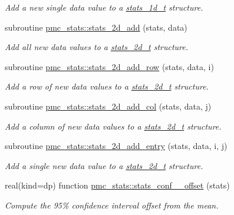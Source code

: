 \begin{DoxyCompactItemize}
\begin{DoxyCompactList}\small\item\em Add a new single data value to a {\ttfamily \mbox{\hyperlink{structpmc__stats_1_1stats__1d__t}{stats\+\_\+1d\+\_\+t}}} structure. \end{DoxyCompactList}\item 
subroutine \mbox{\hyperlink{namespacepmc__stats_adf44b0b2ca237de63a455f077ad5c51e}{pmc\+\_\+stats\+::stats\+\_\+2d\+\_\+add}} (stats, data)
\begin{DoxyCompactList}\small\item\em Add all new data values to a {\ttfamily \mbox{\hyperlink{structpmc__stats_1_1stats__2d__t}{stats\+\_\+2d\+\_\+t}}} structure. \end{DoxyCompactList}\item 
subroutine \mbox{\hyperlink{namespacepmc__stats_a130511c11730c58ad4e4a75eece0330b}{pmc\+\_\+stats\+::stats\+\_\+2d\+\_\+add\+\_\+row}} (stats, data, i)
\begin{DoxyCompactList}\small\item\em Add a row of new data values to a {\ttfamily \mbox{\hyperlink{structpmc__stats_1_1stats__2d__t}{stats\+\_\+2d\+\_\+t}}} structure. \end{DoxyCompactList}\item 
subroutine \mbox{\hyperlink{namespacepmc__stats_a3d4adead65ab33601c8d28a1edb89755}{pmc\+\_\+stats\+::stats\+\_\+2d\+\_\+add\+\_\+col}} (stats, data, j)
\begin{DoxyCompactList}\small\item\em Add a column of new data values to a {\ttfamily \mbox{\hyperlink{structpmc__stats_1_1stats__2d__t}{stats\+\_\+2d\+\_\+t}}} structure. \end{DoxyCompactList}\item 
subroutine \mbox{\hyperlink{namespacepmc__stats_ab357ab9aa317d0059079eb870bfc17eb}{pmc\+\_\+stats\+::stats\+\_\+2d\+\_\+add\+\_\+entry}} (stats, data, i, j)
\begin{DoxyCompactList}\small\item\em Add a single new data value to a {\ttfamily \mbox{\hyperlink{structpmc__stats_1_1stats__2d__t}{stats\+\_\+2d\+\_\+t}}} structure. \end{DoxyCompactList}\item 
real(kind=dp) function \mbox{\hyperlink{namespacepmc__stats_a9cecea8dc7d64a4b8800f09e7bc2d54f}{pmc\+\_\+stats\+::stats\+\_\+conf\+\_\+\_\+offset}} (stats)
\begin{DoxyCompactList}\small\item\em Compute the 95\% confidence interval offset from the mean. \end{DoxyCompactList}\item 

\end{DoxyCompactItemize}
